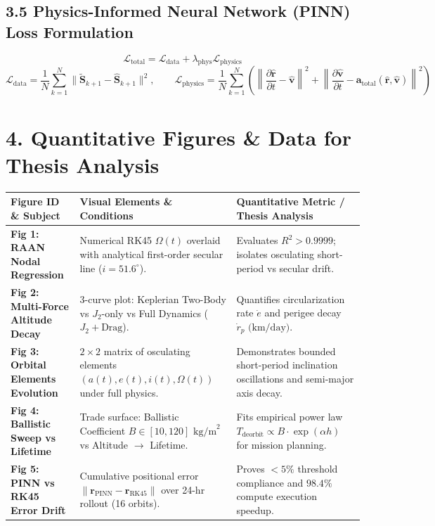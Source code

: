 \documentclass[11pt,a4paper]{article}
\begin{document}
\subsection*{3.5 Physics-Informed Neural Network (PINN) Loss Formulation}
\begin{equation}
    \mathcal{L}_{\text{total}} = \mathcal{L}_{\text{data}} + \lambda_{\text{phys}} \mathcal{L}_{\text{physics}}
\end{equation}
\begin{equation}
    \mathcal{L}_{\text{data}} = \frac{1}{N}\sum_{k=1}^N \|\tilde{\mathbf{S}}_{k+1} - \hat{\mathbf{S}}_{k+1}\|^2, \qquad \mathcal{L}_{\text{physics}} = \frac{1}{N}\sum_{k=1}^N \left( \left\| \frac{\partial \hat{\mathbf{r}}}{\partial t} - \hat{\mathbf{v}} \right\|^2 + \left\| \frac{\partial \hat{\mathbf{v}}}{\partial t} - \mathbf{a}_{\text{total}}(\hat{\mathbf{r}}, \hat{\mathbf{v}}) \right\|^2 \right)
\end{equation}

\vspace{6pt}
\section*{4. Quantitative Figures \& Data for Thesis Analysis}

\begin{table}[h!]
\centering
\small
\begin{tabular}{p{3.5cm} p{7.5cm} p{5cm}}
\toprule
\textbf{Figure ID \& Subject} & \textbf{Visual Elements \& Conditions} & \textbf{Quantitative Metric / Thesis Analysis} \\
\midrule
\textbf{Fig 1: RAAN Nodal Regression} & Numerical RK45 $\Omega(t)$ overlaid with analytical first-order secular line ($i=51.6^\circ$). & Evaluates $R^2 > 0.9999$; isolates osculating short-period vs secular drift. \\
\addlinespace[3pt]
\textbf{Fig 2: Multi-Force Altitude Decay} & 3-curve plot: Keplerian Two-Body vs $J_2$-only vs Full Dynamics ($J_2 + \text{Drag}$). & Quantifies circularization rate $\dot{e}$ and perigee decay $\dot{r}_p\text{ (km/day)}$. \\
\addlinespace[3pt]
\textbf{Fig 3: Orbital Elements Evolution} & $2 \times 2$ matrix of osculating elements $(a(t), e(t), i(t), \Omega(t))$ under full physics. & Demonstrates bounded short-period inclination oscillations and semi-major axis decay. \\
\addlinespace[3pt]
\textbf{Fig 4: Ballistic Sweep vs Lifetime} & Trade surface: Ballistic Coefficient $B \in [10, 120]\text{ kg/m}^2$ vs Altitude $\to$ Lifetime. & Fits empirical power law $T_{\text{deorbit}} \propto B \cdot \exp(\alpha h)$ for mission planning. \\
\addlinespace[3pt]
\textbf{Fig 5: PINN vs RK45 Error Drift} & Cumulative positional error $\|\mathbf{r}_{\text{PINN}} - \mathbf{r}_{\text{RK45}}\|$ over 24-hr rollout (16 orbits). & Proves $<5\%$ threshold compliance and $98.4\%$ compute execution speedup. \\
\bottomrule
\end{tabular}
\end{table}
\end{document}
